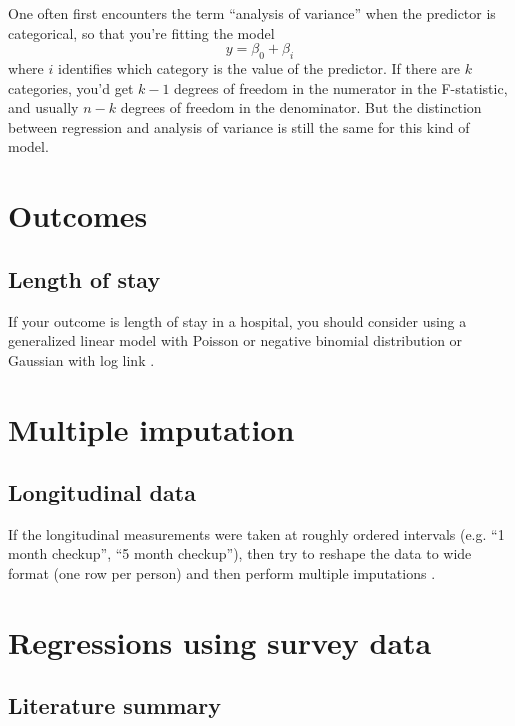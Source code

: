 \documentclass[]{book}
\theoremstyle{definition}
\theoremstyle{definition}
\theoremstyle{remark}
\begin{document}
One often first encounters the term ``analysis of variance'' when the
predictor is categorical, so that you're fitting the model \[
y = \beta_0 + \beta_i
\] where \(i\) identifies which category is the value of the predictor.
If there are \(k\) categories, you'd get \(k-1\) degrees of freedom in
the numerator in the F-statistic, and usually \(n-k\) degrees of freedom
in the denominator. But the distinction between regression and analysis
of variance is still the same for this kind of model.

\chapter{Outcomes}\label{outcomes}

\section{Length of stay}\label{length-of-stay}

If your outcome is length of stay in a hospital, you should consider
using a generalized linear model with Poisson or negative binomial
distribution or Gaussian with log link \citep{austin_comparison_2002}.

\chapter{Multiple imputation}\label{multiple-imputation}

\section{Longitudinal data}\label{longitudinal-data}

If the longitudinal measurements were taken at roughly ordered intervals
(e.g. ``1 month checkup'', ``5 month checkup''), then try to reshape the
data to wide format (one row per person) and then perform multiple
imputations
\citep[\citet{statistical_consulting_group_ucla_how_2017}]{allison_missing_2002}.

\chapter{Regressions using survey
data}\label{regressions-using-survey-data}

\section{Literature summary}\label{literature-summary}
\end{document}
